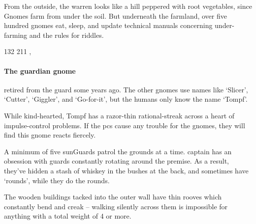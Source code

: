 \begin{multicols}{2}
From the outside, the warren looks like a hill peppered with root vegetables, since Gnomes farm from under the soil.%
But underneath the farmland, over five hundred gnomes eat, sleep, and update technical manuals concerning under-farming and the rules for riddles.

%
  {{1}{3}{2}}%
  {{2}{1}{1}}%
  {%
    \rapier
    \partialleather
  }%
  {\weaponmaster, \guardian}%
  {\rations}%
  {}%

\paragraph{The guardian gnome}
retired from the \gls{guard} some years ago.
The other gnomes use names like `Slicer', `Cutter', `Giggler', and `Go-for-it', but the humans only know the name `Tompf'.

While kind-hearted, Tompf has a razor-thin rational-streak across a heart of impulse-control problems.
If the \glspl{pc} cause any trouble for the gnomes, they will find this gnome reacts fiercely.


A minimum of five \glspl{sunGuard} patrol the grounds at a time.
\Gls{captain} has an obsession with guards constantly rotating around the premise.
As a result, they've hidden a stash of whiskey in the bushes at the back, and sometimes have `rounds', while they do the rounds.

The wooden buildings tacked into the outer wall have thin rooves which constantly bend and creak -- walking silently across them is impossible for anything with a total \gls{weight} of 4 or more.


\end{multicols}
